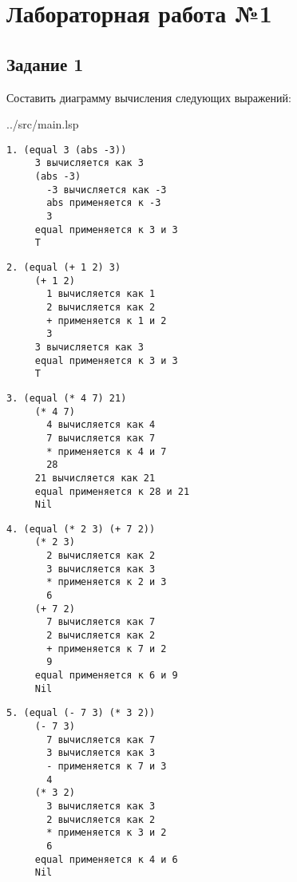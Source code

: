 \chapter*{Лабораторная работа №1}

\section*{Задание 1}

Составить диаграмму вычисления следующих выражений:

\begin{lstinputlisting}[
	caption={Задание 1},
	label={lst:t1},
	style={lsp},
	linerange={3-8},
	]{../src/main.lsp}
\end{lstinputlisting}

\begin{lstlisting}[style={scheme}]
1. (equal 3 (abs -3))
     3 вычисляется как 3
     (abs -3)
       -3 вычисляется как -3
       abs применяется к -3
       3
     equal применяется к 3 и 3
     T
\end{lstlisting}

\begin{lstlisting}[style={scheme}]
2. (equal (+ 1 2) 3)
     (+ 1 2)
       1 вычисляется как 1
       2 вычисляется как 2
       + применяется к 1 и 2
       3
     3 вычисляется как 3
     equal применяется к 3 и 3
     T
\end{lstlisting}

\begin{lstlisting}[style={scheme}]
3. (equal (* 4 7) 21)
     (* 4 7)
       4 вычисляется как 4
       7 вычисляется как 7
       * применяется к 4 и 7
       28
     21 вычисляется как 21
     equal применяется к 28 и 21
     Nil
\end{lstlisting}

\begin{lstlisting}[style={scheme}]
4. (equal (* 2 3) (+ 7 2))
     (* 2 3)
       2 вычисляется как 2
       3 вычисляется как 3
       * применяется к 2 и 3
       6
     (+ 7 2)
       7 вычисляется как 7
       2 вычисляется как 2
       + применяется к 7 и 2
       9
     equal применяется к 6 и 9
     Nil
\end{lstlisting}

\begin{lstlisting}[style={scheme}]
5. (equal (- 7 3) (* 3 2))
     (- 7 3)
       7 вычисляется как 7
       3 вычисляется как 3
       - применяется к 7 и 3
       4
     (* 3 2)
       3 вычисляется как 3
       2 вычисляется как 2
       * применяется к 3 и 2
       6
     equal применяется к 4 и 6
     Nil
\end{lstlisting}

